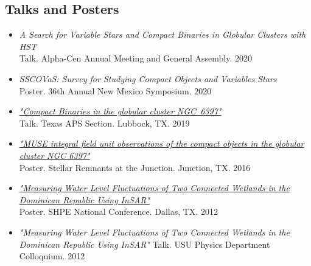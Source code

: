 \documentclass[letterpaper,10pt]{article}
\begin{document}
\subsection*{Talks and Posters}

\begin{itemize}[label=$\blacktriangleright$]


\item \textit{A Search for Variable Stars and Compact Binaries in Globular Clusters with HST}\\ Talk. Alpha-Cen Annual Meeting and General Assembly. 2020


\item \textit{SSCOVaS: Survey for Studying Compact Objects and Variables Stars}\\ Poster. 36th Annual New Mexico Symposium. 2020

\item \textit{\href{https://manuelpm.me/TexasAPS2019/}{"Compact Binaries in the globular cluster NGC~6397"}} \\Talk. Texas APS Section. Lubbock, TX. 2019



\item \textit{\href{http://manuelpm.me/papers/MUSEposter.pdf}{"MUSE integral field unit observations of the compact objects in the globular cluster NGC 6397"}} \\Poster. Stellar Remnants at the Junction. Junction, TX. 2016




\item \textit{\href{http://manuelpm.me/papers/posterinsar.pdf}{"Measuring Water Level Fluctuations of Two Connected Wetlands in the Dominican Republic Using InSAR"}} \\Poster. SHPE National Conference. Dallas, TX. 2012

\item \emph{"Measuring Water Level Fluctuations of Two Connected Wetlands in the Dominican Republic Using InSAR"}
Talk. USU Physics Department Colloquium. 2012
\end{itemize}
\begin{comment}
\subsection*{Media Coverage}

\begin{itemize}[label=$\blacktriangleright$]

\item \hyperref[https://phys.org/news/2017-03-planetary-earth-sun.html]{Planetary waves, first found on Earth, are discovered on Sun (phys.org)}

\end{itemize}
\end{comment}
\end{document}
